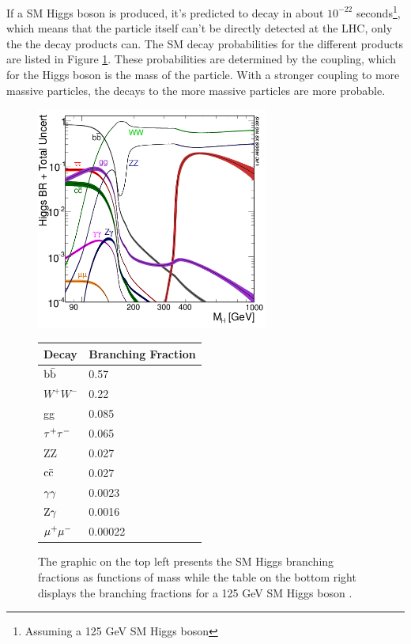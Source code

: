 If a SM Higgs boson is produced, it's predicted to decay in about $10^{-22}$ seconds\footnote{Assuming a 125 GeV SM Higgs boson}, which means that the particle itself can't be directly detected at the LHC, only the the decay products can. The SM decay probabilities for the different products are listed in Figure \ref{fig:hbranch}. These probabilities are determined by the coupling, which for the Higgs boson is the mass of the particle. With a stronger coupling to more massive particles, the decays to the more massive particles are more probable.
\begin{figure}[h!]
  \centering
  \includegraphics[width=3in]{images/Higgs_BR.png}
  \begin{tabular}{ ll }
    \hline
    Decay & Branching Fraction \\
    \hline
    ${\rm b\bar{b}}$ & 0.57 \\
    $W^+W^-$ & 0.22\\
    gg & 0.085 \\
    ${\rm \tau^+\tau^-}$ & 0.065 \\
    ZZ & 0.027 \\
    ${\rm c\bar{c}}$ & 0.027 \\
    ${\rm \gamma\gamma}$ & 0.0023 \\
    ${\rm Z}\gamma$ & 0.0016 \\
    ${\rm \mu^{+}\mu^{-}}$ & 0.00022 \\
    \hline
  \end{tabular} 
  \caption[Higgs boson branching fractions.]
{The graphic on the top left presents the SM Higgs branching fractions as functions of mass while the table on the bottom right displays the branching fractions for a 125 GeV SM Higgs boson \cite{crossbranchplots}.}
  \label{fig:hbranch}
\end{figure}

